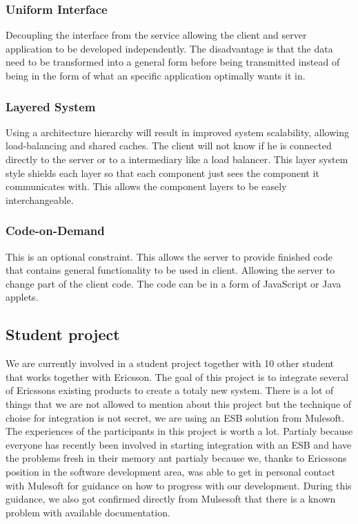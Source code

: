 \documentclass{llncs}
\begin{document}
\subsubsection{Uniform Interface}
Decoupling the interface from the service allowing the client and server application to be developed  independently. The disadvantage is that the data need to be transformed into a general form before being transmitted instead of being in the form of what an specific application optimally wants it in.

\subsubsection{Layered System}
Using a architecture hierarchy will result in improved system scalability, allowing load-balancing and shared caches. The client will not know if he is connected directly to the server or to a intermediary like a load balancer. This layer system style shields each layer so that each component just sees the component it communicates with. This allows the component layers to be easely interchangeable.

\subsubsection{Code-on-Demand}
This is an optional constraint. This allows the server to provide finished code that contains general functionality to be used in client. Allowing the server to change part of the client code. The code can be in a form of JavaScript or Java applets.

\subsection{Student project}
We are currently involved in a student project together with 10 other student that works together with Ericsson. The goal of this project is to integrate several of Ericssons existing products to create a totaly new system. There is a lot of things that we are not allowed to mention about this project but the technique of choise for integration is not secret, we are using an ESB solution from Mulesoft. The experiences of the participants in this project is worth a lot. Partialy because everyone has recently been involved in starting integration with an ESB and have the problems fresh in their memory ant partialy because we, thanks to Ericssons position in the software development area, was able to get in personal contact with Mulesoft for guidance on how to progress with our development. During this guidance, we also got confirmed directly from Mulsesoft that there is a known problem with available documentation.
\end{document}
